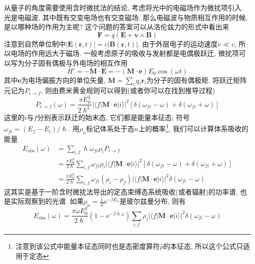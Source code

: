     从量子的角度需要使用含时微扰法的结论, 考虑将光中的电磁场作为微扰项引入. 光是电磁波, 其中既有交变电场也有交变磁场. 那么电磁波与物质相互作用的时候, 是以哪种场的作用为主呢? 这个问题的答案可以从洛伦兹力的形式中看出来
    \begin{equation}
        \bm{F} = q (\bm{E} + \bm{v} \times \bm{B})
    \end{equation}
    注意到自然单位制中$|\bm{E}(\bm r,t)| = c|\bm{B}(\bm r,t)|$. 由于外层电子的运动速度$v \ll c$, 所以电场的作用远大于磁场. 一般考虑原子的吸收与发射都是电偶极跃迁, 微扰项可以写为分子固有偶极与外电场的相互作用
    \begin{equation}
        H' = - \bm{M} \cdot \bm{E} = - (\bm{M} \cdot \bm{e}) E_0 \cos(\omega t)
    \end{equation}
    其中$\bm{e}$为电场偏振方向的单位矢量, $\bm{M} = \sum_i q_i \bm{r}_i$为分子的固有偶极矩. 将跃迁矩阵元记为$P_{i\to f}$, 则由费米黄金规则可以得到(或者你可以在\cite{蒋鸿中物化:含时微扰}找到推导过程)
    \begin{equation}
        P_{i\to f}(\omega) = \frac{\pi E_0^2}{2\hslash^2} \left| \langle f|\bm{M} \cdot \bm{e}|i \rangle \right|^2 \left[ \delta(\omega_{fi} - \omega) + \delta(\omega_{fi} + \omega) \right]
    \end{equation}
    这里的$i$与$f$分别表示跃迁的始末态, 它们都是能量本征态; 符号$\omega_{fi} = (E_f - E_i)/\hslash$. 用$\rho_n$标记体系处于态$n$上的概率\footnote{注意到该公式中能量本征态同时也是态密度算符$\hat\rho$的本征态, 所以这个公式只适用于定态}, 我们可以计算体系吸收的能量
    \begin{equation}\begin{aligned}
        E_\mathrm{abs}(\omega) 
        &= \sum_{i,f}  \hslash\omega_{fi} \rho_i P_{i\to f} \\
        &= \frac{\pi E_0^2}{2\hslash} \sum_{i,f} \omega_{fi} \rho_i \left| \langle f|\bm{M} \cdot \bm{e}|i \rangle \right|^2 \left[ \delta(\omega_{fi} - \omega) + \delta(\omega_{fi} + \omega) \right] \\
        &= \frac{\pi E_0^2}{2\hslash} \sum_{i,f} \omega_{fi} (\rho_i - \rho_f) \left| \langle f|\bm{M} \cdot \bm{e}|i \rangle \right|^2 \delta(\omega_{fi} - \omega)
    \end{aligned}\end{equation}
    这其实是基于一阶含时微扰法导出的定态束缚态系统吸收(或者辐射)的功率谱, 也是实际观察到的光谱. 如果$\rho_n = \frac 1Z \mathrm{e}^{-\beta E_n}$是玻尔兹曼分布, 则有
    \begin{equation}
        E_\mathrm{abs}(\omega) = \frac{\pi \omega E_0^2}{2\hslash} (1 - \mathrm{e}^{-\beta\hslash\omega}) \sum_{i,f} \rho_i \left| \langle f|\bm{M} \cdot \bm{e}|i \rangle \right|^2 \delta(\omega_{fi} - \omega)
    \end{equation}

